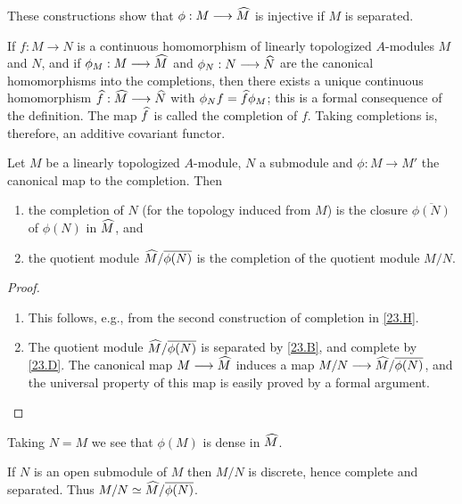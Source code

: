 \documentclass[../main]{subfiles}
\begin{document}
These constructions show that $\phi : M \longrightarrow \widehat{M}$ is injective if $M$ is separated. 

\newparagraph If $f : M \longrightarrow N$ is a continuous homomorphism of linearly topologized $A$-modules $M$ and $N$, and if $\phi_M : M \longrightarrow \widehat{M}$ and $\phi_N : N \longrightarrow \widehat{N}$ are the canonical homomorphisms into the completions, then there exists a unique continuous homomorphism $\widehat{f} : \widehat{M} \longrightarrow \widehat{N}$ with $\phi_N f = \widehat{f} \phi_M$; this is a formal consequence of the definition. The map $\widehat{f}$ is called the completion of $f$. Taking completions is, therefore, an additive covariant functor.

\begin{proposition}
Let $M$ be a linearly topologized $A$-module, $N$ a submodule and $\phi : M \longrightarrow M'$ the canonical map to the completion. Then 
\begin{enumerate}[label= (\roman*)]
    \item the completion of $N$ (for the topology induced from $M$) is the closure $\overline {\phi(N)}$ of $\phi(N)$ in $\widehat{M}$, and
    \item the quotient module $\widehat{M}/\overline {\phi(N)}$ is the completion of the quotient module $M/N$.
\end{enumerate}
\end{proposition}

\begin{proof}
\begin{enumerate}[label= (\roman*)]
    \item This follows, e.g., from the second construction of completion in \ref{23.H}.
    \item The quotient module $\widehat{M}/\overline {\phi(N)}$ is separated by \ref{23.B}, and complete by \ref{23.D}. The canonical map $M \longrightarrow \widehat{M}$ induces a map $M/N \longrightarrow \widehat{M}/\overline {\phi(N)}$, and the universal property of this map is easily proved by a formal argument. 
\end{enumerate}
\end{proof}

\begin{remark}
Taking $N = M$ we see that $\phi(M)$ is dense in $\widehat{M}$. 
\end{remark}

\begin{remark}
If $N$ is an open submodule of $M$ then $M/N$ is discrete, hence complete and separated. Thus $M/N \simeq \widehat{M}/\overline{\phi(N)}$.
\end{remark}
\end{document}

